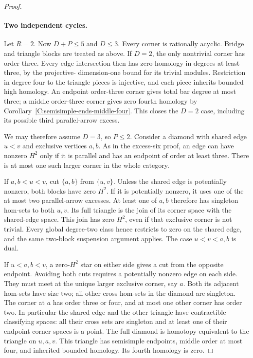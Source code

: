 \begin{proof}
\paragraph{Two independent cycles.}
Let $R=2$.  Now $D+P\leq5$ and $D\leq3$.
Every corner is rationally acyclic.  Bridge and triangle
blocks are treated as above.  If $D=2$, the only nontrivial
corner has order three.  Every edge intersection then has
zero homology in degrees at least three, by the projective-
dimension-one bound for its trivial modules.  Restriction
in degree four to the triangle pieces is injective, and
each piece inherits bounded high homology.  An endpoint
order-three corner gives total bar degree at most three;
a middle order-three corner gives zero fourth homology by
Corollary~\ref{C:semisimple-ends-middle-four}.  This closes
the $D=2$ case, including its possible third parallel-arrow
excess.

We may therefore assume $D=3$, so $P\leq2$.
Consider a diamond with
shared edge $u<v$ and exclusive vertices $a,b$.
As in the excess-six proof, an edge can have nonzero
$H^2$ only if it is parallel and has an endpoint of
order at least three.  There is at most one such larger
corner in the whole category.

If $a,b<u<v$, cut $\{a,b\}$ from $\{u,v\}$.
Unless the shared edge is potentially nonzero, both
blocks have zero $H^2$.  If it is potentially nonzero,
it uses one of the at most two parallel-arrow excesses.
At least one of $a,b$ therefore has singleton hom-sets
to both $u,v$.  Its full triangle is the join of its
corner space with the shared-edge space.  This join has
zero $H^2$, even if that exclusive corner is not trivial.
Every global degree-two class hence restricts to zero
on the shared edge, and the same two-block suspension
argument applies.  The case $u<v<a,b$ is dual.

If $u<a,b<v$, a zero-$H^2$ star on either side gives
a cut from the opposite endpoint.  Avoiding both cuts
requires a potentially nonzero edge on each side.
They must meet at the unique larger exclusive corner,
say $a$.  Both its adjacent hom-sets have size two;
all other cross hom-sets in the diamond are singleton.
The corner at $a$ has order three or four, and at most
one other corner has order two.  In particular the
shared edge and the other triangle have contractible
classifying spaces: all their cross sets are singleton
and at least one of their endpoint corner spaces is a
point.  The full diamond is homotopy equivalent to the
triangle on $u,a,v$.  This triangle has semisimple
endpoints, middle order at most four, and inherited
bounded homology.  Its fourth homology is zero.


\end{proof}
